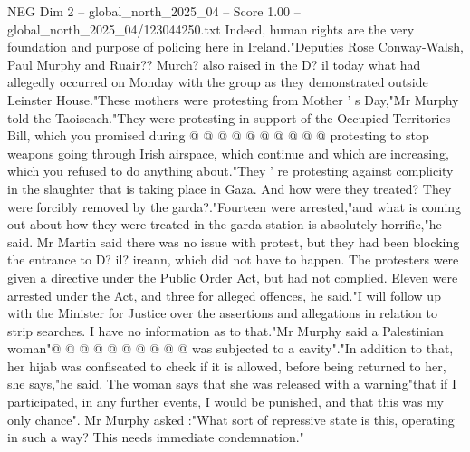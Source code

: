 \begin{textsample}{NEG Dim 2 – global\_north\_2025\_04 – Score 1.00 – global\_north\_2025\_04/123044250.txt}
Indeed, human rights are the very foundation and purpose of policing here in Ireland."Deputies Rose Conway-Walsh, Paul Murphy and Ruair??
Murch? also raised in the D? il today what had allegedly occurred on Monday with the group as they demonstrated outside Leinster House."These mothers were protesting from Mother ' s Day,"Mr Murphy told the Taoiseach."They were protesting in support of the Occupied Territories Bill, which you promised during @ @ @ @ @ @ @ @ @ @ protesting to stop weapons going through Irish airspace, which continue and which are increasing, which you refused to do anything about."They ' re protesting against complicity in the slaughter that is taking place in Gaza.
And how were they treated?
They were forcibly removed by the garda?."Fourteen were arrested,"and what is coming out about how they were treated in the garda station is absolutely horrific,"he said.
Mr Martin said there was no issue with protest, but they had been blocking the entrance to D? il? ireann, which did not have to happen.
The protesters were given a directive under the Public Order Act, but had not complied.
Eleven were arrested under the Act, and three for alleged offences, he said."I will follow up with the Minister for Justice over the assertions and allegations in relation to strip searches.
I have no information as to that."Mr Murphy said a Palestinian woman"@ @ @ @ @ @ @ @ @ @ was subjected to a cavity"."In addition to that, her hijab was confiscated to check if it is allowed, before being returned to her, she says,"he said.
The woman says that she was released with a warning"that if I participated, in any further events, I would be punished, and that this was my only chance".
Mr Murphy asked :"What sort of repressive state is this, operating in such a way?
This needs immediate condemnation."

\end{textsample}
